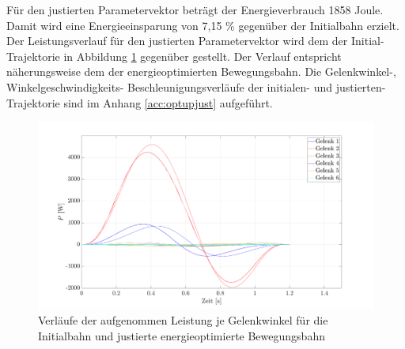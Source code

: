 %
Für den justierten Parametervektor beträgt der Energieverbrauch 1858 Joule. Damit wird eine Energieeinsparung von 7,15 \% gegenüber der Initialbahn erzielt. Der Leistungsverlauf für den justierten Parametervektor wird dem der Initial-Trajektorie in Abbildung \ref{fig:poptfinal} gegenüber gestellt. Der Verlauf entspricht näherungsweise dem der  energieoptimierten Bewegungsbahn. Die Gelenkwinkel-, Winkelgeschwindigkeits- Beschleunigungsverläufe der  initialen- und justierten-Trajektorie sind im Anhang \ref{acc:optupjust} aufgeführt.
%
\begin{figure}[tbph]
	\centering
	\includegraphics[width=1\linewidth]{images/Optimierungsergebnisse_up/poptfinal}
	\caption{Verläufe der aufgenommen Leistung je Gelenkwinkel für die Initialbahn und justierte energieoptimierte Bewegungsbahn}
	\label{fig:poptfinal}
\end{figure}
